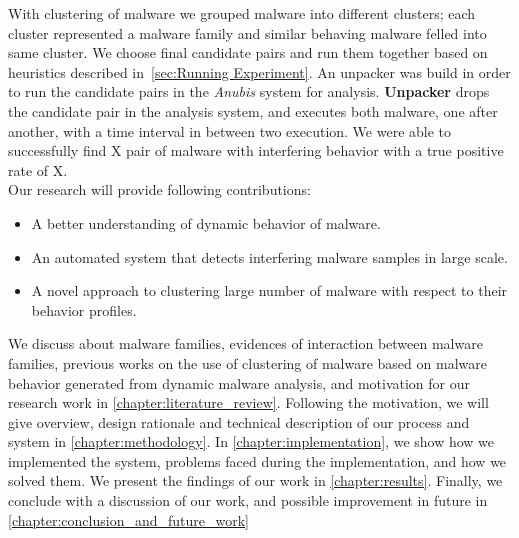 With clustering of malware we grouped malware into different clusters; each cluster represented a malware family and similar behaving malware felled into same cluster.
We choose final candidate pairs and run them together based on heuristics described in~\autoref{sec:Running Experiment}.
An unpacker was build in order to run the candidate pairs in the \emph{Anubis} system for analysis.
\textbf{Unpacker} drops the candidate pair in the analysis system, and executes both malware, one after another, with a time interval in between two execution.
We were able to successfully find X pair of malware with interfering behavior with a true positive rate of X.\\
Our research will provide following contributions:
\begin{itemize}
  \item A better understanding of dynamic behavior of malware.
  \item An automated system that detects interfering malware samples in large scale.
  \item A novel approach to clustering large number of malware with respect to their behavior profiles.
\end{itemize}
We discuss about malware families, evidences of interaction between malware families, previous works on the use of clustering of malware based on malware behavior generated from dynamic malware analysis, and motivation for our research work in \autoref{chapter:literature_review}.
Following the motivation, we will give overview, design rationale and technical description of our process and system in \autoref{chapter:methodology}.
In \autoref{chapter:implementation}, we show how we implemented the system, problems faced during the implementation, and how we solved them.
We present the findings of our work in \autoref{chapter:results}.
Finally, we conclude with a discussion of our work, and possible improvement in future in \autoref{chapter:conclusion_and_future_work}
